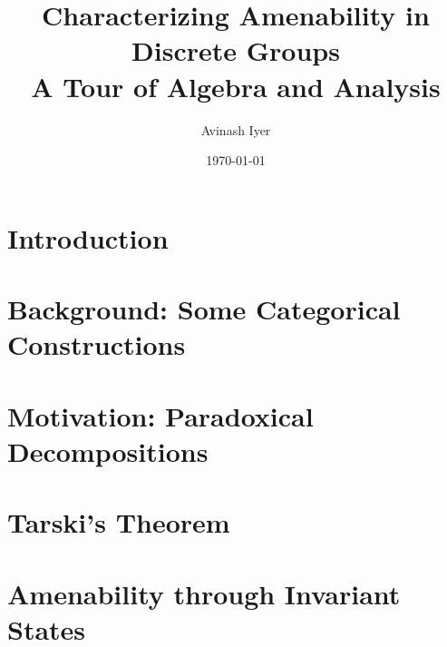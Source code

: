 \documentclass[10pt]{package2}
\title{Characterizing Amenability in Discrete Groups\\{\large A Tour of Algebra and Analysis}}
\author{Avinash Iyer}
\date{\today}
\begin{document}
\maketitle
\RaggedRight
\tableofcontents
\chapter{Introduction}
%
\chapter{Background: Some Categorical Constructions}\label{ch:categorical_constructions}

\chapter{Motivation: Paradoxical Decompositions}\label{ch:paradoxical_decompositions}

\chapter{Tarski's Theorem}\label{ch:tarskis_theorem}

\chapter{Amenability through Invariant States}\label{ch:invariant_states}

\end{document}
